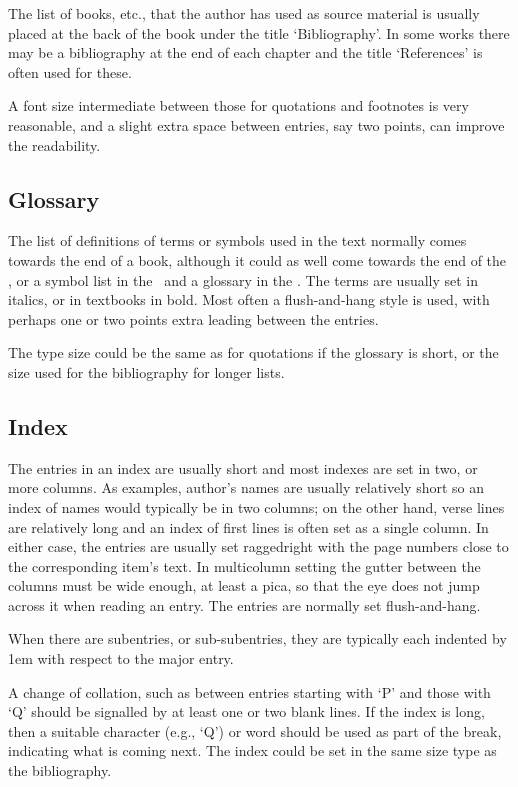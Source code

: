 \documentclass[10pt,letterpaper,extrafontsizes]{memoir}
\begin{document}
   The list of books, etc., that the author has used as source material is
usually placed at the back of the book under the title `Bibliography'. In
some works there may be a bibliography at the end of 
each chapter and the title `References' is often used for these.

    A font size intermediate between those for quotations and footnotes is
very reasonable, and a slight extra space between entries, say two points,
can improve the readability.

\subsection{Glossary}

   The list of definitions of terms or symbols used in the text normally
comes towards the end of a book, although it could as well come towards
the end of the \pixfrontmatter, or a symbol list 
in the \pixfrontmatter\ and a glossary
in the \pixbackmatter. The terms are usually set in italics, or in textbooks 
in bold. Most often a flush-and-hang style is used, with
perhaps one or two points extra leading between the entries.

    The type size could be the same as for quotations if the glossary is short,
or the size used for the bibliography for longer lists.

\subsection{Index}

    The entries in an index are usually short and most indexes
are set in two, or more columns. As examples, author's names are usually 
relatively short so an index of names would typically be in two columns;
on the other hand, verse lines are relatively long and an index of first lines
is often set as a single column. In either case, the entries are usually set 
raggedright with the page numbers close to the corresponding item's text.
In multicolumn setting the gutter between the columns must be wide enough,
at least a pica, so
that the eye does not jump across it when reading an entry. The entries are
normally set flush-and-hang.

    When there are subentries, or sub-subentries, they are typically
each indented by 1em with respect to the major entry.

   A change of collation, such as between entries starting with `P' and those
with `Q' should be signalled by at least one or two blank lines. If the index
is long, then a suitable character (e.g., `Q') or word should be used as 
part of the break, indicating what is coming next. The index could be set
in the same size type as the bibliography.
\end{document}
